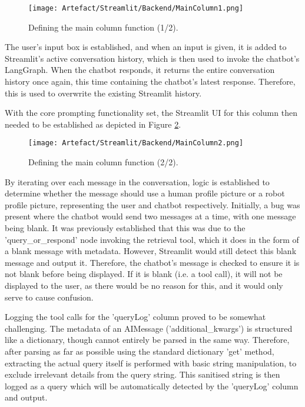 \begin{figure}[H]
    \centering
    \texttt{[image: Artefact/Streamlit/Backend/MainColumn1.png]}
    \caption{Defining the main column function (1/2). \label{fig:StreamlitMainColumn1}}
\end{figure}

\noindent The user's input box is established, and when an input is given, it is added to Streamlit's active 
conversation history, which is then used to invoke the chatbot's LangGraph. When the chatbot responds, it returns 
the entire conversation history once again, this time containing the chatbot's latest response. Therefore, this is used 
to overwrite the existing Streamlit history.

\para With the core prompting functionality set, the Streamlit UI for this column then needed to be established as depicted 
in Figure \ref{fig:StreamlitMainColumn2}.

\begin{figure}[H]
    \centering
    \texttt{[image: Artefact/Streamlit/Backend/MainColumn2.png]}
    \caption{Defining the main column function (2/2). \label{fig:StreamlitMainColumn2}}
\end{figure}

\noindent By iterating over each message in the conversation, logic is established to determine whether the message should 
use a human profile picture or a robot profile picture, representing the user and chatbot respectively. Initially, a bug was 
present where the chatbot would send two messages at a time, with one message being blank. It was previously established that 
this was due to the 'query\_or\_respond' node invoking the retrieval tool, which it does in the form of a blank message with 
metadata. However, Streamlit would still detect this blank message and output it. Therefore, the chatbot's message is checked 
to ensure it is not blank before being displayed. If it is blank (i.e. a tool call), it will not be displayed to the user, as 
there would be no reason for this, and it would only serve to cause confusion.

\para Logging the tool calls for the 'queryLog' column proved to be somewhat challenging. The metadata of an AIMessage ('additional\_kwargs')
is structured like a dictionary, though cannot entirely be parsed in the same way. Therefore, after parsing as far as possible using the 
standard dictionary 'get' method, extracting the actual query itself is performed with basic string manipulation, to exclude irrelevant 
details from the query string. This sanitised string is then logged as a query which will be automatically detected by the 'queryLog' column
and output.

